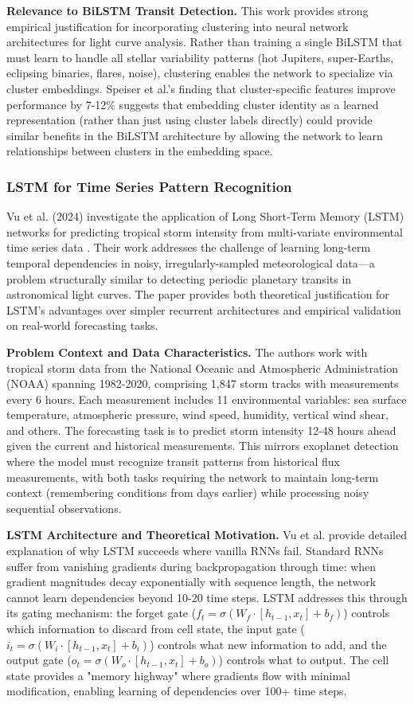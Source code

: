 \documentclass[letterpaper]{article} %
\begin{document}
\textbf{Relevance to BiLSTM Transit Detection.} This work provides strong empirical justification for incorporating clustering into neural network architectures for light curve analysis. Rather than training a single BiLSTM that must learn to handle all stellar variability patterns (hot Jupiters, super-Earths, eclipsing binaries, flares, noise), clustering enables the network to specialize via cluster embeddings. Speiser et al.'s finding that cluster-specific features improve performance by 7-12\% suggests that embedding cluster identity as a learned representation (rather than just using cluster labels directly) could provide similar benefits in the BiLSTM architecture by allowing the network to learn relationships between clusters in the embedding space.

\subsubsection{LSTM for Time Series Pattern Recognition}
Vu et al. (2024) investigate the application of Long Short-Term Memory (LSTM) networks for predicting tropical storm intensity from multi-variate environmental time series data \cite{Vu2024LSTM}. Their work addresses the challenge of learning long-term temporal dependencies in noisy, irregularly-sampled meteorological data—a problem structurally similar to detecting periodic planetary transits in astronomical light curves. The paper provides both theoretical justification for LSTM's advantages over simpler recurrent architectures and empirical validation on real-world forecasting tasks.

\textbf{Problem Context and Data Characteristics.} The authors work with tropical storm data from the National Oceanic and Atmospheric Administration (NOAA) spanning 1982-2020, comprising 1,847 storm tracks with measurements every 6 hours. Each measurement includes 11 environmental variables: sea surface temperature, atmospheric pressure, wind speed, humidity, vertical wind shear, and others. The forecasting task is to predict storm intensity 12-48 hours ahead given the current and historical measurements. This mirrors exoplanet detection where the model must recognize transit patterns from historical flux measurements, with both tasks requiring the network to maintain long-term context (remembering conditions from days earlier) while processing noisy sequential observations.

\textbf{LSTM Architecture and Theoretical Motivation.} Vu et al. provide detailed explanation of why LSTM succeeds where vanilla RNNs fail. Standard RNNs suffer from vanishing gradients during backpropagation through time: when gradient magnitudes decay exponentially with sequence length, the network cannot learn dependencies beyond 10-20 time steps. LSTM addresses this through its gating mechanism: the forget gate ($f_t = \sigma(W_f \cdot [h_{t-1}, x_t] +   b_f)$) controls which information to discard from cell state, the input gate ($i_t = \sigma(W_i \cdot [h_{t-1}, x_t] + b_i)$) controls what new information to add, and the output gate ($o_t = \sigma(W_o \cdot [h_{t-1}, x_t] + b_o)$) controls what to output. The cell state provides a "memory highway" where gradients flow with minimal modification, enabling learning of dependencies over 100+ time steps.
\end{document}
